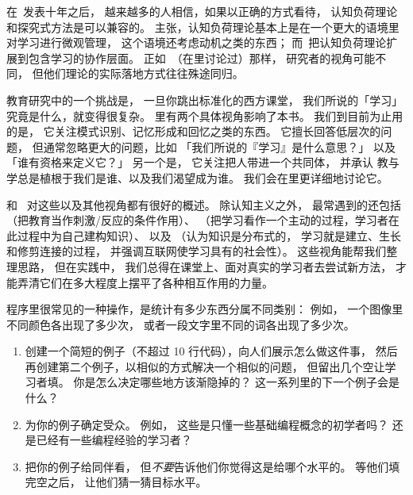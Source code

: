 在~\cite{Kirs2006}发表十年之后，
越来越多的人相信，如果以正确的方式看待，
认知负荷理论和探究式方法是可以兼容的。
\cite{Kaly2015}主张，认知负荷理论基本上是在一个更大的语境里对学习进行微观管理，
这个语境还考虑动机之类的东西；
而~\cite{Kirs2018}把认知负荷理论扩展到包含学习的协作层面。
正如~\cite{Mark2018}（在里讨论过）那样，
研究者的视角可能不同，
但他们理论的实际落地方式往往殊途同归。

教育研究中的一个挑战是，
一旦你跳出标准化的西方课堂，
我们所说的「学习」究竟是什么，就变得很复杂。
里有两个具体视角影响了本书。
我们到目前为止用的是，
它关注模式识别、记忆形成和回忆之类的东西。
它擅长回答低层次的问题，
但通常忽略更大的问题，比如
「我们所说的『学习』是什么意思？」
以及「谁有资格来定义它？」
另一个是，
它关注把人带进一个共同体，
并承认
教与学总是植根于我们是谁、以及我们渴望成为谁。
我们会在里更详细地讨论它。

和~\cite{Wibu2016}
对这些以及其他视角都有很好的概述。
除认知主义之外，
最常遇到的还包括
（把教育当作刺激/反应的条件作用）、
（把学习看作一个主动的过程，学习者在此过程中为自己建构知识）、
以及
（认为知识是分布式的，
学习就是建立、生长和修剪连接的过程，
并强调互联网使学习具有的社会性）。
这些视角能帮我们整理思路，
但在实践中，
我们总得在课堂上、面对真实的学习者去尝试新方法，
才能弄清它们在多大程度上摆平了各种相互作用的力量。



程序里很常见的一种操作，是统计有多少东西分属不同类别：
例如，
一个图像里不同颜色各出现了多少次，
或者一段文字里不同的词各出现了多少次。

\begin{enumerate}
\item
  创建一个简短的例子（不超过 10 行代码），向人们展示怎么做这件事，
  然后再创建第二个例子，以相似的方式解决一个相似的问题，
  但留出几个空让学习者填。
  你是怎么决定哪些地方该渐隐掉的？
  这一系列里的下一个例子会是什么？

\item
  为你的例子确定受众。
  例如，
  这些是只懂一些基础编程概念的初学者吗？
  还是已经有一些编程经验的学习者？

\item
  把你的例子给同伴看，
  但\emph{不要}告诉他们你觉得这是给哪个水平的。
  等他们填完空之后，
  让他们猜一猜目标水平。
\end{enumerate}

